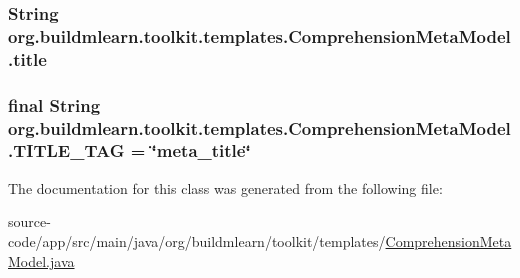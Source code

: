 \subsubsection[{\texorpdfstring{title}{title}}]{\setlength{\rightskip}{0pt plus 5cm}String org.\+buildmlearn.\+toolkit.\+templates.\+Comprehension\+Meta\+Model.\+title\hspace{0.3cm}{\ttfamily [private]}}\hypertarget{classorg_1_1buildmlearn_1_1toolkit_1_1templates_1_1ComprehensionMetaModel_a904f81c4bb8b842a42b4dd9ff6c7af57}{}\label{classorg_1_1buildmlearn_1_1toolkit_1_1templates_1_1ComprehensionMetaModel_a904f81c4bb8b842a42b4dd9ff6c7af57}
\subsubsection[{\texorpdfstring{T\+I\+T\+L\+E\+\_\+\+T\+AG}{TITLE_TAG}}]{\setlength{\rightskip}{0pt plus 5cm}final String org.\+buildmlearn.\+toolkit.\+templates.\+Comprehension\+Meta\+Model.\+T\+I\+T\+L\+E\+\_\+\+T\+AG = \char`\"{}meta\+\_\+title\char`\"{}\hspace{0.3cm}{\ttfamily [static]}}\hypertarget{classorg_1_1buildmlearn_1_1toolkit_1_1templates_1_1ComprehensionMetaModel_ab1fe2f4e431c321ba34b7a35d3dda4f6}{}\label{classorg_1_1buildmlearn_1_1toolkit_1_1templates_1_1ComprehensionMetaModel_ab1fe2f4e431c321ba34b7a35d3dda4f6}


The documentation for this class was generated from the following file\+:\begin{DoxyCompactItemize}
\item 
source-\/code/app/src/main/java/org/buildmlearn/toolkit/templates/\hyperlink{ComprehensionMetaModel_8java}{Comprehension\+Meta\+Model.\+java}\end{DoxyCompactItemize}
